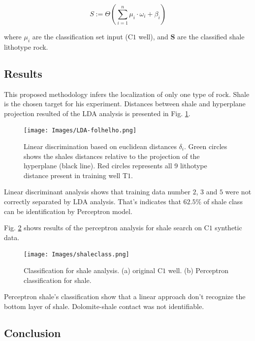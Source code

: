 \documentclass{cilamce19}
\begin{document}
\begin{equation}
\textit{S} :=  \Theta  (\sum_{i=1}^{n} \mu_{i} \cdot \omega_{i} + \beta_{i})
\label{percep}
\end{equation}

where $\mu_{i}$ are the classification set input (C$1$ well), and $\textbf{S}$ are the classified shale lithotype rock.

\subsection{Results}

This proposed methodology infers the localization of only one type of rock. Shale is the chosen target for his experiment. Distances between shale and hyperplane projection resulted of the LDA analysis is presented in Fig. \ref{LDA}. 

\begin{figure}[ht]
	\centering %
	\texttt{[image: Images/LDA-folhelho.png]} 
	\caption{Linear discrimination based on euclidean distances $\delta_{i}$. Green circles shows the shales distances relative to the projection of the hyperplane (black line). Red circles represents all 9 lithotype distance present in training well T$1$.}
	\label{LDA}
\end{figure}

Linear discriminant analysis shows that training data number $2$, $3$ and $5$ were not correctly separated by LDA analysis. That's indicates that $62.5\%$ of shale class can be identification by Perceptron model. 

Fig. \ref{classification} shows results of the perceptron analysis for shale search on C$1$ synthetic data. 


\begin{figure}[ht]
	\centering %
	\texttt{[image: Images/shaleclass.png]} 
	\caption{Classification for shale analysis. (a) original C$1$ well. (b) Perceptron classification for shale.}
	\label{classification}
\end{figure}

Perceptron shale's classification show that a linear approach don't recognize the bottom layer of shale. Dolomite-shale contact was not identifiable.

\subsection{Conclusion} 
\end{document}
